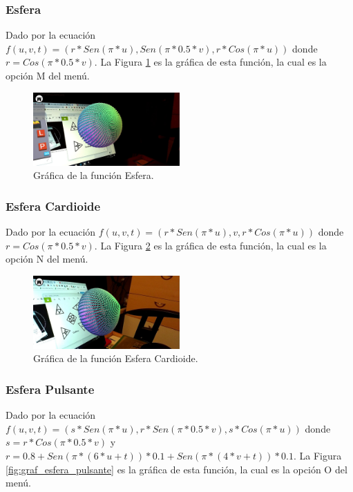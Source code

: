 \subsubsection{Esfera}
Dado por la ecuación $f(u,v,t)=(r*Sen(\pi * u), Sen(\pi * 0.5 * v), r*Cos(\pi * u))$ donde $r = Cos(\pi * 0.5 * v)$. La Figura \ref{fig:graf_esfera} es la gráfica de esta función, la cual es la opción M del menú.

\begin{figure}[hbt!]
\centering
\includegraphics[width=0.5\textwidth]{figuras/graficas/esfera.png}
\caption{\label{fig:graf_esfera}Gráfica de la función Esfera.}
\end{figure}
\FloatBarrier

\subsubsection{Esfera Cardioide}
Dado por la ecuación $f(u,v,t)=(r*Sen(\pi * u), v, r*Cos(\pi * u))$ donde $r = Cos(\pi * 0.5 * v)$. La Figura \ref{fig:graf_esfera_cardioide} es la gráfica de esta función, la cual es la opción N del menú.

\begin{figure}[hbt!]
\centering
\includegraphics[width=0.5\textwidth]{figuras/graficas/esfera_cardioide.png}
\caption{\label{fig:graf_esfera_cardioide}Gráfica de la función Esfera Cardioide.}
\end{figure}
\FloatBarrier

\subsubsection{Esfera Pulsante}
Dado por la ecuación $f(u,v,t)=(s*Sen(\pi * u), r * Sen(\pi * 0.5 * v), s*Cos(\pi * u))$ donde $s = r*Cos(\pi * 0.5 * v)$ y $r=0.8 + Sen(\pi * (6 * u + t)) * 0.1 + Sen(\pi * (4 * v + t)) * 0.1$. La Figura \ref{fig:graf_esfera_pulsante} es la gráfica de esta función, la cual es la opción O del menú.

